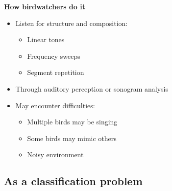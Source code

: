 \documentclass[t, xcolor={dvipsnames}]{beamer}
\begin{document}
\begin{frame}[fragile]
  \vspace{0.5cm}
  {\bfseries\Large How birdwatchers do it}\\
  \vspace{0.5cm}
  \begin{addmargin}{0.5cm}
    \begin{itemize}
      \item Listen for structure and composition:
      \begin{itemize}
        \item Linear tones
        \item Frequency sweeps
        \item Segment repetition
      \end{itemize}
      \item Through auditory perception or sonogram analysis
      \item May encounter difficulties:
      \begin{itemize}
        \item Multiple birds may be singing
        \item Some birds may mimic others
        \item Noisy environment
      \end{itemize}
    \end{itemize}
  \end{addmargin}
\end{frame}


\subsection{As a classification problem}
\end{document}
